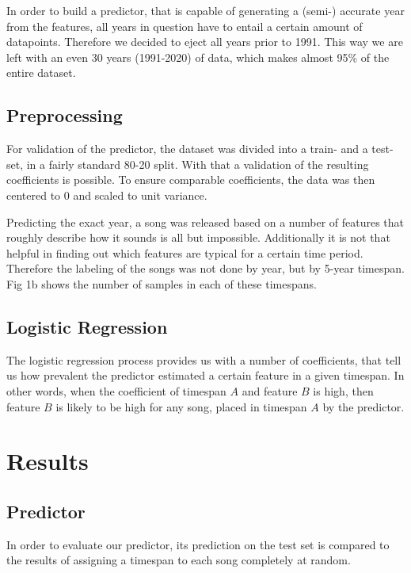 \documentclass{article}
\begin{document}
In order to build a predictor, that is capable of generating a (semi-) accurate year from the features, all years in question have to entail a certain amount of datapoints. Therefore we decided to eject all years prior to 1991. This way we are left with an even 30 years (1991-2020) of data, which makes almost 95\% of the entire dataset.

\subsection{Preprocessing}

For validation of the predictor, the dataset was divided into a train- and a test-set, in a fairly standard 80-20 split. With that a validation of the resulting coefficients is possible.
To ensure comparable coefficients, the data was then centered to 0 and scaled to unit variance. 

Predicting the exact year, a song was released based on a number of features that roughly describe how it sounds is all but impossible. Additionally it is not that helpful in finding out which features are typical for a certain time period.
Therefore the labeling of the songs was not done by year, but by 5-year timespan. Fig 1b \answerTODO{} shows the number of samples in each of these timespans.

\subsection{Logistic Regression}


The logistic regression process provides us with a number of coefficients, that tell us how prevalent the predictor estimated a certain feature in a given timespan. In other words, when the coefficient of timespan $A$ and feature $B$ is high, then feature $B$ is likely to be high for any song, placed in timespan $A$ by the predictor.


\section{Results}

\subsection{Predictor}

In order to evaluate our predictor, its prediction on the test set is compared to the results of assigning a timespan to each song completely at random.
\end{document}
